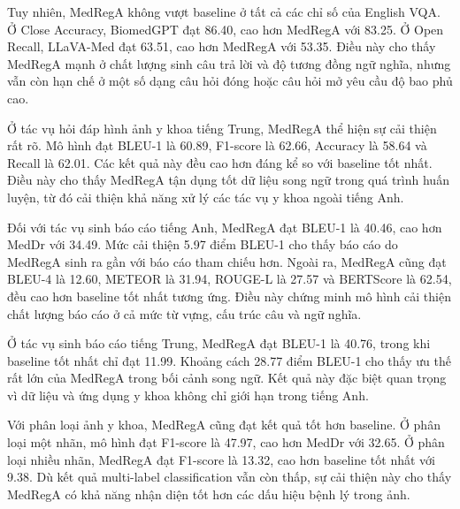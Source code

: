 \documentclass[12pt,a4paper,oneside]{extarticle}
\begin{document}
Tuy nhiên, MedRegA không vượt baseline ở tất cả các chỉ số của English VQA. Ở Close Accuracy, BiomedGPT đạt 86.40, cao hơn MedRegA với 83.25. Ở Open Recall, LLaVA-Med đạt 63.51, cao hơn MedRegA với 53.35. Điều này cho thấy MedRegA mạnh ở chất lượng sinh câu trả lời và độ tương đồng ngữ nghĩa, nhưng vẫn còn hạn chế ở một số dạng câu hỏi đóng hoặc câu hỏi mở yêu cầu độ bao phủ cao.

Ở tác vụ hỏi đáp hình ảnh y khoa tiếng Trung, MedRegA thể hiện sự cải thiện rất rõ. Mô hình đạt BLEU-1 là 60.89, F1-score là 62.66, Accuracy là 58.64 và Recall là 62.01. Các kết quả này đều cao hơn đáng kể so với baseline tốt nhất. Điều này cho thấy MedRegA tận dụng tốt dữ liệu song ngữ trong quá trình huấn luyện, từ đó cải thiện khả năng xử lý các tác vụ y khoa ngoài tiếng Anh.

Đối với tác vụ sinh báo cáo tiếng Anh, MedRegA đạt BLEU-1 là 40.46, cao hơn MedDr với 34.49. Mức cải thiện 5.97 điểm BLEU-1 cho thấy báo cáo do MedRegA sinh ra gần với báo cáo tham chiếu hơn. Ngoài ra, MedRegA cũng đạt BLEU-4 là 12.60, METEOR là 31.94, ROUGE-L là 27.57 và BERTScore là 62.54, đều cao hơn baseline tốt nhất tương ứng. Điều này chứng minh mô hình cải thiện chất lượng báo cáo ở cả mức từ vựng, cấu trúc câu và ngữ nghĩa.

Ở tác vụ sinh báo cáo tiếng Trung, MedRegA đạt BLEU-1 là 40.76, trong khi baseline tốt nhất chỉ đạt 11.99. Khoảng cách 28.77 điểm BLEU-1 cho thấy ưu thế rất lớn của MedRegA trong bối cảnh song ngữ. Kết quả này đặc biệt quan trọng vì dữ liệu và ứng dụng y khoa không chỉ giới hạn trong tiếng Anh.

Với phân loại ảnh y khoa, MedRegA cũng đạt kết quả tốt hơn baseline. Ở phân loại một nhãn, mô hình đạt F1-score là 47.97, cao hơn MedDr với 32.65. Ở phân loại nhiều nhãn, MedRegA đạt F1-score là 13.32, cao hơn baseline tốt nhất với 9.38. Dù kết quả multi-label classification vẫn còn thấp, sự cải thiện này cho thấy MedRegA có khả năng nhận diện tốt hơn các dấu hiệu bệnh lý trong ảnh.
\end{document}
